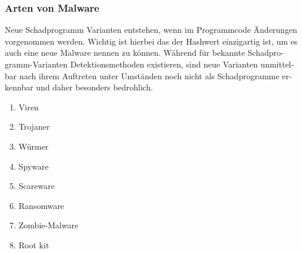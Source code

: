 \begin{otherlanguage}{ngerman}
\subsubsection{Arten von Malware}
Neue Schadprogramm Varianten entstehen, wenn im Programmcode Änderungen vorgenommen werden. Wichtig ist hierbei das der Hashwert einzigartig ist, um es auch eine neue Malware nennen zu können. 
\newline Während für bekannte Schadprogramm-Varianten Detektionsmethoden existieren, sind neue Varianten unmittelbar nach ihrem Auftreten unter Umständen noch nicht als Schadprogramme erkennbar und daher besonders bedrohlich. 
\newline 
\begin{enumerate}
    \item Viren
    \item Trojaner
    \item Würmer
    \item Spyware
    \item Scareware
    \item Ransomware
    \item Zombie-Malware
    \item Root kit
\end{enumerate}

\end{otherlanguage}